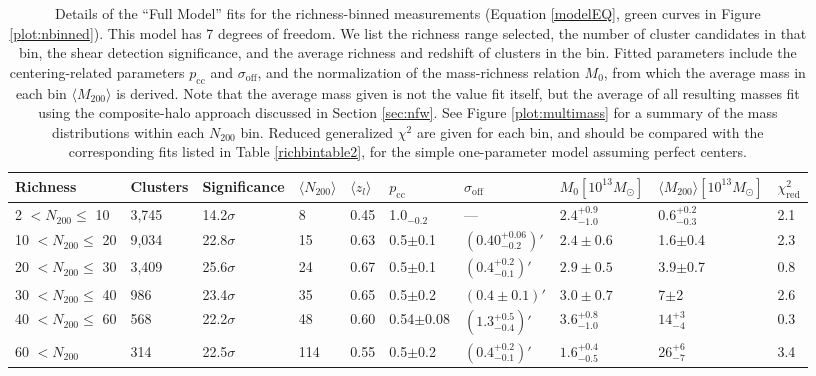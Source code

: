 \begin{landscape}

\begin{table}
\centering
    \caption[Shear Results for Richness-Binned Clusters (Full Model)]{Details of the ``Full Model'' fits for the richness-binned measurements (Equation \ref{modelEQ}, green curves in Figure \ref{plot:nbinned}). This model has 7 degrees of freedom. We list the richness range selected, the number of cluster candidates in that bin, the shear detection significance, and the average richness and redshift of clusters in the bin. Fitted parameters include the centering-related parameters $p_{\mathrm{cc}}$ and $\sigma_{\mathrm{off}}$, and the normalization of the mass-richness relation $M_0$, from which the average mass in each bin $\langle M_{200} \rangle$ is derived. Note that the average mass given is not the value fit itself, but the average of all resulting masses fit using the composite-halo approach discussed in Section \ref{sec:nfw}. See Figure \ref{plot:multimass} for a summary of the mass distributions within each $N_{200}$ bin. Reduced generalized $\chi^2$ are given for each bin, and should be compared with the corresponding fits listed in Table \ref{richbintable2}, for the simple one-parameter model assuming perfect centers.}
    \begin{tabular}{llllllllll}
      \hline
      Richness & Clusters & Significance & $\langle N_{200} \rangle$ & $\langle z_l \rangle$ & $p_{\mathrm{cc}}$ & $\sigma_{\mathrm{off}}$ & $M_0 \left[ 10^{13} M_{\odot}\right]$ & $\langle M_{200} \rangle \left[ 10^{13} M_{\odot}\right]$ & $\chi^2_{\mathrm{red}}$ \\ \hline
      2 $<N_{200}\leq$ 10 & 3,745 & 14.2$\sigma$ & 8 & 0.45 & 1.0$_{-0.2}$ & \---- & $2.4^{+0.9}_{-1.0}$ & $0.6^{+0.2}_{-0.3}$ & 2.1  \\
      10 $<N_{200}\leq$ 20 & 9,034 & 22.8$\sigma$ & 15 & 0.63 & 0.5$\pm$0.1 & $(0.40^{+0.06}_{-0.2})'$ & $2.4\pm0.6$ & 1.6$\pm$0.4 & 2.3 \\
      20 $<N_{200}\leq$ 30 & 3,409 & 25.6$\sigma$ & 24 & 0.67 & 0.5$\pm$0.1 & $(0.4^{+0.2}_{-0.1})'$ & $2.9\pm0.5$ & 3.9$\pm$0.7 & 0.8 \\
      30 $<N_{200}\leq$ 40 & 986 & 23.4$\sigma$ & 35 & 0.65 & 0.5$\pm$0.2 & $(0.4\pm0.1)'$ & $3.0\pm0.7$ & 7$\pm$2 & 2.6 \\
      40 $<N_{200}\leq$ 60 & 568 & 22.2$\sigma$ & 48 & 0.60 & 0.54$\pm$0.08 & $(1.3^{+0.5}_{-0.4})'$ & $3.6^{+0.8}_{-1.0}$ & $14^{+3}_{-4}$ & 0.3 \\
      60 $<N_{200}$ & 314 & 22.5$\sigma$ & 114 & 0.55 & 0.5$\pm$0.2 & $(0.4^{+0.2}_{-0.1})'$ & $1.6^{+0.4}_{-0.5}$ & 26$^{+6}_{-7}$ & 3.4 \\
      \hline
    \end{tabular}
\label{richbintable1}
\end{table}


\end{landscape}
